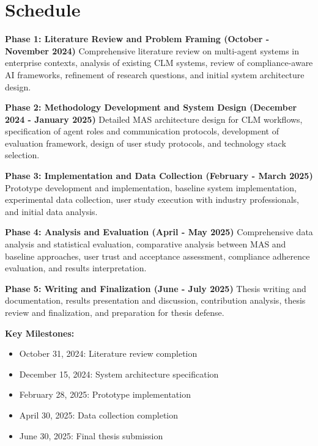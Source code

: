 
\chapter{Schedule}\label{chapter:schedule}

\textbf{Phase 1: Literature Review and Problem Framing (October - November 2024)}
Comprehensive literature review on multi-agent systems in enterprise contexts, analysis of existing CLM systems, review of compliance-aware AI frameworks, refinement of research questions, and initial system architecture design.

\textbf{Phase 2: Methodology Development and System Design (December 2024 - January 2025)}
Detailed MAS architecture design for CLM workflows, specification of agent roles and communication protocols, development of evaluation framework, design of user study protocols, and technology stack selection.

\textbf{Phase 3: Implementation and Data Collection (February - March 2025)}
Prototype development and implementation, baseline system implementation, experimental data collection, user study execution with industry professionals, and initial data analysis.

\textbf{Phase 4: Analysis and Evaluation (April - May 2025)}
Comprehensive data analysis and statistical evaluation, comparative analysis between MAS and baseline approaches, user trust and acceptance assessment, compliance adherence evaluation, and results interpretation.

\textbf{Phase 5: Writing and Finalization (June - July 2025)}
Thesis writing and documentation, results presentation and discussion, contribution analysis, thesis review and finalization, and preparation for thesis defense.

\textbf{Key Milestones:}
\begin{itemize}
    \item October 31, 2024: Literature review completion
    \item December 15, 2024: System architecture specification
    \item February 28, 2025: Prototype implementation
    \item April 30, 2025: Data collection completion
    \item June 30, 2025: Final thesis submission
\end{itemize}
